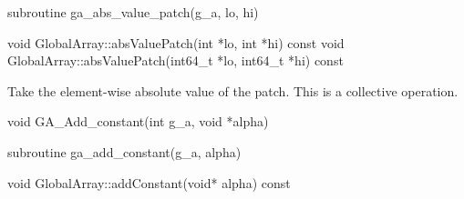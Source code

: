 \documentclass[12pt]{article}
\begin{document}
\begin{fapi}
\begin{fcode}
subroutine ga_abs_value_patch(g_a, lo, hi)
\end{fcode}
\begin{funcargs}
\end{funcargs}
\end{fapi}

\begin{cxxapi}
\begin{cxxcode}
void GlobalArray::absValuePatch(int *lo, int *hi) const
void GlobalArray::absValuePatch(int64_t *lo, int64_t *hi) const
\end{cxxcode}
\begin{funcargs}
\end{funcargs}
\end{cxxapi}
\gcoll

\begin{desc}

Take the element-wise absolute value of the patch.
This is a collective operation.
\end{desc}


\begin{capi}
\begin{ccode}
void GA_Add_constant(int g_a, void *alpha)
\end{ccode}
\begin{funcargs}
\end{funcargs}
\end{capi}

\begin{fapi}
\begin{fcode}
subroutine ga_add_constant(g_a,  alpha)
\end{fcode}
\begin{funcargs}
\end{funcargs}
\end{fapi}

\begin{cxxapi}
\begin{cxxcode}
void GlobalArray::addConstant(void* alpha) const
\end{cxxcode}
\begin{funcargs}
\end{funcargs}
\end{cxxapi}
\end{document}
